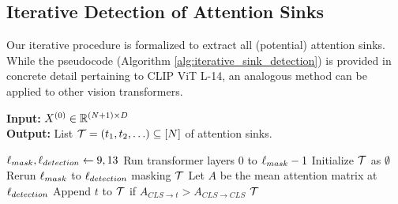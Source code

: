 \subsection{Iterative Detection of Attention Sinks}



\label{sec:iterative_masking}
Our iterative procedure is formalized to extract all (potential) attention sinks. While the pseudocode (Algorithm \ref{alg:iterative_sink_detection}) is provided in concrete detail pertaining to CLIP ViT L-14, an analogous method can be applied to other vision transformers.
\begin{algorithm}[H]
    \caption{Attention Sink Detection via Iterative Removal}
    \hspace*{\algorithmicindent} \textbf{Input:} $X^{(0)} \in \mathbb{R}^{(N + 1) \times D}$ \\
    \hspace*{\algorithmicindent} \textbf{Output:} List $\mathcal{T} = (t_1, t_2, \ldots) \subseteq [N]$ of attention sinks.
    \begin{algorithmic}[1]
            \State $\ell_{mask}, \ell_{detection} \gets 9, 13$
            \State Run transformer layers $0$ to $\ell_{mask} - 1$
            \State Initialize $\mathcal{T}$ as $\emptyset$
                \State Rerun $\ell_{mask}$ to $\ell_{detection}$ masking $\mathcal{T}$
                \State Let $A$ be the mean attention matrix at $\ell_{detection}$
                \State Append $t$ to $\mathcal{T}$ if $A_{CLS \to t} > A_{CLS \to CLS}$
            \EndWhile
            \State \Return $\mathcal{T}$
        \EndProcedure
    \end{algorithmic}
    \label{alg:iterative_sink_detection}
\end{algorithm}
\vspace{-8pt}
